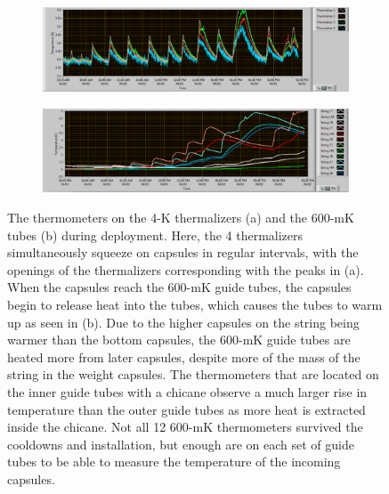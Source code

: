 \begin{figure}[htbp]
\centering
\begin{subfigure}[t]{0.9\textwidth}
\centering
\includegraphics[width=\textwidth]{Figures/Thermalizer_operation.png}
\caption{}
\label{fig:4K_operation}
\end{subfigure}
\qquad
\begin{subfigure}[t]{0.9\textwidth}
\centering
\includegraphics[width=\textwidth]{Figures/Chicane_operation.png}
\caption{}
\label{fig:Chicane_operation}
\end{subfigure}
\caption[The thermometers on the 4-K thermalizers (a) and the 600-mK tubes (b) during a deployment.]
{The thermometers on the 4-K thermalizers (a) and the 600-mK tubes (b) during deployment.
Here, the 4 thermalizers simultaneously squeeze on capsules in regular intervals, with the openings of the thermalizers corresponding with the peaks in (a).
When the capsules reach the 600-mK guide tubes, the capsules begin to release heat into the tubes, which causes the tubes to warm up as seen in (b).
Due to the higher capsules on the string being warmer than the bottom capsules, the 600-mK guide tubes are heated more from later capsules, despite more of the mass of the string in the weight capsules.
The thermometers that are located on the inner guide tubes with a chicane observe a much larger rise in temperature than the outer guide tubes as more heat is extracted inside the chicane.
Not all 12 600-mK thermometers survived the cooldowns and installation, but enough are on each set of guide tubes to be able to measure the temperature of the incoming capsules.}
\label{fig:Thermalization_operation}
\end{figure}

